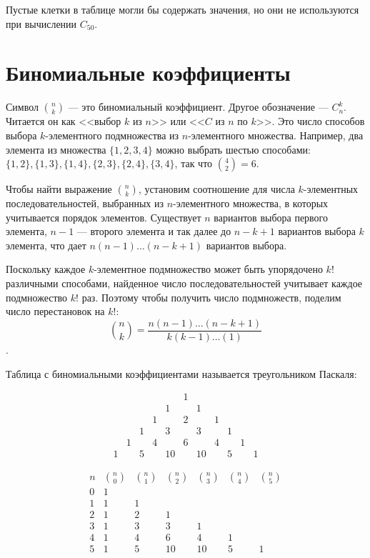 \documentclass[14pt,openany]{book}
\begin{document}
Пустые клетки в таблице могли бы содержать значения, но они не используются при вычислении
$C_{50}$.

\section{Биномиальные коэффициенты}

Символ $\binom{n}{k}$ --- это биномиальный коэффициент. Другое обозначение --- $C_n^k$.
Читается он как <<выбор $k$ из $n$>> или <<$C$ из $n$ по $k$>>. Это число способов выбора
$k$-элементного подмножества из $n$-элементного множества. Например, два элемента
из множества $\{1,2,3,4\}$ можно выбрать шестью способами: 
$\{1,2\}, \{1,3\}, \{1,4\}, \{2,3\}, \{2,4\}, \{3,4\}$, так что $\binom{4}{2}=6$.

Чтобы найти выражение $\binom{n}{k}$, установим соотношение для числа $k$-элементных
последовательностей, выбранных из $n$-элементного множества, в которых учитывается порядок
элементов. Существует $n$ вариантов выбора первого элемента, $n-1$ --- второго элемента
и так далее до $n-k+1$ вариантов выбора $k$ элемента, что дает $n(n-1)\ldots(n-k+1)$
вариантов выбора.

Поскольку каждое $k$-элементное подмножество может быть упорядочено $k!$ различными способами,
найденное число последовательностей учитывает каждое подмножество $k!$ раз. Поэтому чтобы
получить число подмножеств, поделим число перестановок на $k!$:
$$\binom{n}{k} = \frac{n(n-1)\ldots(n-k+1)}{k(k-1)\ldots(1)}$$.

Таблица с биномиальными коэффициентами называется треугольником Паскаля:

$$
 \begin{array}{ccccccccccc}
 &&&&& 1 \\
 &&&& 1 && 1 \\
 &&& 1 && 2 && 1 \\
 && 1 && 3 && 3 && 1 \\
 & 1 && 4 && 6 && 4 && 1 \\
 1 && 5 && 10 && 10 && 5 && 1
 \end{array}
$$

$$
 \begin{array}{ccccccc}
 n & \binom{n}{0} & \binom{n}{1} & \binom{n}{2} & \binom{n}{3} & \binom{n}{4} & \binom{n}{5} \\
 0 & 1 \\
 1 & 1 & 1 \\
 2 &  1 & 2 & 1 \\
 3 & 1 & 3 & 3 & 1 \\
 4 & 1 & 4 & 6 & 4 & 1 \\
 5 & 1 & 5 & 10 & 10 & 5 & 1
 \end{array}
$$
\end{document}
